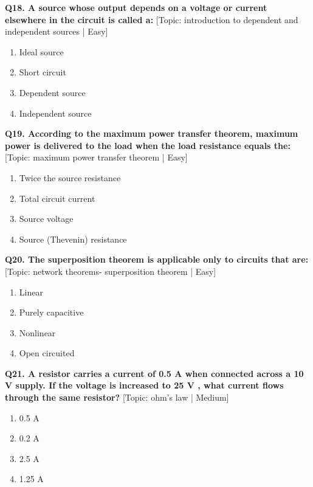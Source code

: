 \noindent\textbf{Q18. A source whose output depends on a voltage or current elsewhere in the circuit is called a:} \hfill [Topic: introduction to dependent and independent sources | Easy]
\begin{enumerate}[label=(\alph*),topsep=2pt,itemsep=1pt,partopsep=0pt,parsep=0pt]
    \item {Ideal source}
    \item {Short circuit}
    \item {Dependent source}
    \item {Independent source}
\end{enumerate}
\vspace{2mm}

\noindent\textbf{Q19. According to the maximum power transfer theorem, maximum power is delivered to the load when the load resistance equals the:} \hfill [Topic: maximum power transfer theorem | Easy]
\begin{enumerate}[label=(\alph*),topsep=2pt,itemsep=1pt,partopsep=0pt,parsep=0pt]
    \item {Twice the source resistance}
    \item {Total circuit current}
    \item {Source voltage}
    \item {Source (Thevenin) resistance}
\end{enumerate}
\vspace{2mm}

\noindent\textbf{Q20. The superposition theorem is applicable only to circuits that are:} \hfill [Topic: network theorems- superposition theorem | Easy]
\begin{enumerate}[label=(\alph*),topsep=2pt,itemsep=1pt,partopsep=0pt,parsep=0pt]
    \item {Linear}
    \item {Purely capacitive}
    \item {Nonlinear}
    \item {Open circuited}
\end{enumerate}
\vspace{2mm}

\noindent\textbf{Q21. A resistor carries a current of 0.5 A when connected across a 10 V supply. If the voltage is increased to 25 V , what current flows through the same resistor?} \hfill [Topic: ohm's law | Medium]
\begin{enumerate}[label=(\alph*),topsep=2pt,itemsep=1pt,partopsep=0pt,parsep=0pt]
    \item {0.5 A}
    \item {0.2 A}
    \item {2.5 A}
    \item {1.25 A}
\end{enumerate}
\vspace{2mm}

